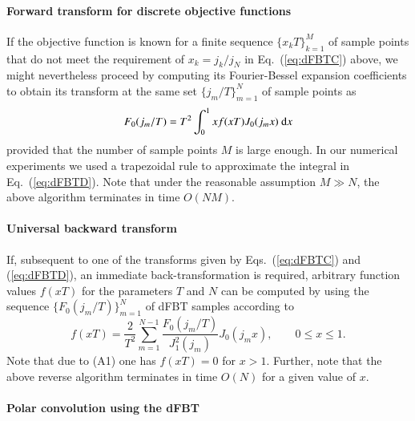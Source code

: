 \documentclass[review]{elsarticle}
\begin{document}
\paragraph{Forward transform for discrete objective functions}

If the objective function is known for a finite sequence $\{x_k T\}_{k=1}^M$ of
sample points that do not meet the requirement of $x_k=j_k/j_N$ in
Eq.~(\ref{eq:dFBTC}) above, we might nevertheless proceed by computing its
Fourier-Bessel expansion coefficients to obtain its transform at the same set
$\{j_m/T\}_{m=1}^N$ of sample points as
\begin{equation}
F_0(j_m/T) = T^2 \int_0^1 x f(x T) J_0(j_m x)~{\rm{d}}x \label{eq:dFBTD}
\end{equation}
provided that the number of sample points $M$ is large enough. In our numerical
experiments we used a trapezoidal rule to approximate the integral in
Eq.~(\ref{eq:dFBTD}).
Note that under the reasonable assumption $M\gg N$, the above algorithm 
terminates in time $O(NM)$.

\paragraph{Universal backward transform}

If, subsequent to one of the transforms given by Eqs.~(\ref{eq:dFBTC}) and 
(\ref{eq:dFBTD}), an immediate back-transformation is required, arbitrary 
function values $f(x T)$ for the parameters $T$ and $N$ can be computed by 
using the sequence $\{F_0(j_m/T)\}_{m=1}^N$ of dFBT samples
according to \cite{FiskJohnson:1987}
\begin{equation}
f(x T) = \frac{2}{T^2} \sum_{m=1}^{N-1} \frac{F_0(j_m/T)}{J_1^2(j_m)} J_0(j_m x), \qquad{0\leq x \leq 1}. \label{eq:dFBTRev}
\end{equation}
Note that due to (A1) one has $f(x T) = 0$ for $x>1$.
Further, note that the above reverse algorithm terminates in time $O(N)$ for
a given value of $x$.

\paragraph{Polar convolution using the dFBT}
\end{document}
